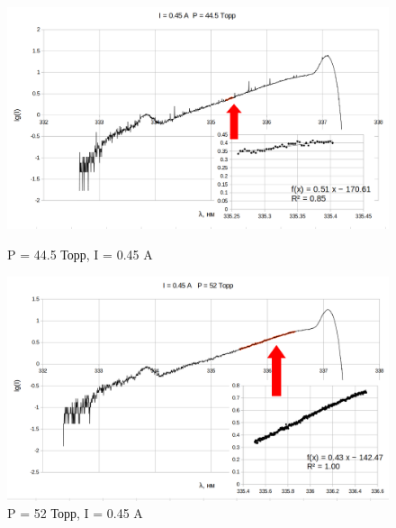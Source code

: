 \documentclass[a4paper,12pt]{article}
\begin{document}
	\begin{figure}[h]
	\begin{center}
	\begin{minipage}[h]{0.45\linewidth}
	\includegraphics[width=1\linewidth]{p_44_5}
	\caption{P = 44.5 Торр, I = 0.45 A} %
	\end{minipage}
	\hfill
	\begin{minipage}[h]{0.45\linewidth}
	\includegraphics[width=1\linewidth]{p_52}
	\caption{P = 52 Торр, I = 0.45 A}
	\end{minipage}
	\end{center}
	\end{figure}
	
\end{document}

